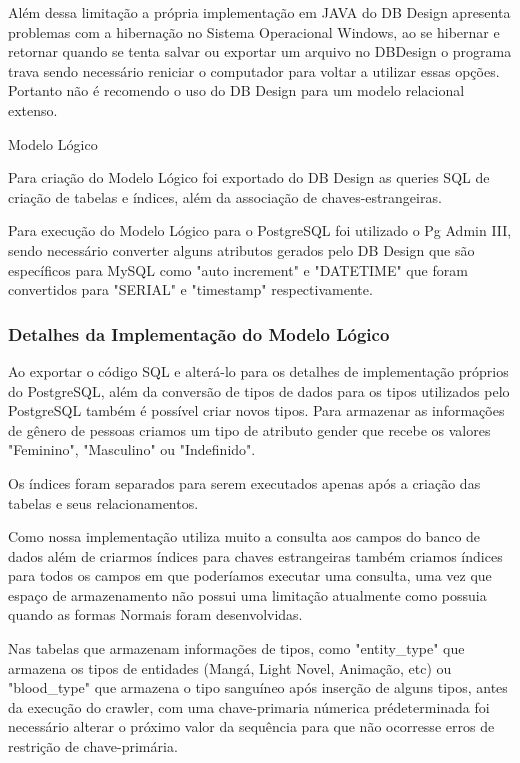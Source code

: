 \documentclass[12pt]{article}
\begin{document}
Além dessa limitação a própria implementação em JAVA do DB Design apresenta problemas com a hibernação no Sistema Operacional Windows, ao se hibernar e retornar quando se tenta salvar ou exportar um arquivo no DBDesign o programa trava sendo necessário reniciar o computador para voltar a utilizar essas opções. Portanto não é recomendo o uso do DB Design para um modelo relacional extenso. 

Modelo Lógico

Para criação do Modelo Lógico foi exportado do DB Design as queries SQL de criação de tabelas e índices, além da associação de chaves-estrangeiras. 

Para execução do Modelo Lógico para o PostgreSQL foi utilizado o Pg Admin III, sendo necessário converter alguns atributos gerados pelo DB Design que são específicos para MySQL como "auto increment" e "DATETIME" que foram convertidos para "SERIAL" e "timestamp" respectivamente.


\subsubsection{Detalhes da Implementação do Modelo Lógico}

Ao exportar o código SQL e alterá-lo para os detalhes de implementação próprios do PostgreSQL, além da conversão de tipos de dados para os tipos utilizados pelo PostgreSQL também é possível criar novos tipos. Para armazenar as informações de gênero de pessoas criamos um tipo de atributo gender que recebe os valores "Feminino", "Masculino" ou "Indefinido".


Os índices foram separados para serem executados apenas após a criação das tabelas e seus relacionamentos.

Como nossa implementação utiliza muito a consulta aos campos do banco de dados além de criarmos índices para chaves estrangeiras também criamos índices para todos os campos em que poderíamos executar uma consulta, uma vez que espaço de armazenamento não possui uma limitação atualmente como possuia quando as formas Normais foram desenvolvidas.

Nas tabelas que armazenam informações de tipos, como "entity\_type" que armazena os tipos de entidades (Mangá, Light Novel, Animação, etc) ou "blood\_type" que armazena o tipo sanguíneo após inserção de alguns tipos, antes da execução do crawler, com uma chave-primaria númerica prédeterminada foi necessário alterar o próximo valor da sequência para que não ocorresse erros de restrição de chave-primária.  
\end{document}
